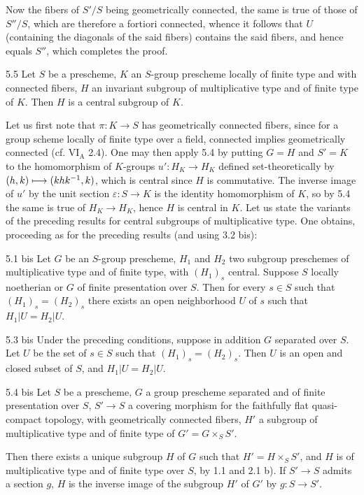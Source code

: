 Now the fibers of $S'/S$ being geometrically connected, the same is true of those of $S''/S$, which are therefore a fortiori connected, whence it follows that $U$ (containing the diagonals of the said fibers) contains the said fibers, and hence equals $S''$, which completes the proof.
\begin{corollary}{5.5}\label{IX.5.5}
Let $S$ be a prescheme, $K$ an $S$-group prescheme locally of finite type and with connected fibers, $H$ an invariant subgroup of multiplicative type and of finite type of $K$. Then $H$ is a central subgroup of $K$.
\end{corollary}
 Let us first note that $\pi:K\to S$ has geometrically connected fibers, since for a group scheme locally of finite type over a field, connected implies geometrically connected (cf. VI$_{\mathrm A}$ 2.4). One may then apply 5.4 by putting $G=H$ and $S'=K$ to the homomorphism of $K$-groups $u':H_K\to H_K$ defined set-theoretically by $(h,k)\longmapsto(khk^{-1},k)$, which is central since $H$ is commutative. The inverse image of $u'$ by the unit section $\varepsilon:S\to K$ is the identity homomorphism of $K$, so by 5.4 the same is true of $H_K\to H_K$, hence $H$ is central in $K$.
Let us state the variants of the preceding results for central subgroups of multiplicative type. One obtains, proceeding as for the preceding results (and using 3.2 bis):
\begin{theorem}{5.1 bis}\label{IX.5.1bis}
Let $G$ be an $S$-group prescheme, $H_1$ and $H_2$ two subgroup preschemes of multiplicative type and of finite type, with $(H_1)_s$ central. Suppose $S$ locally noetherian or $G$ of finite presentation over $S$. Then for every $s\in S$ such that $(H_1)_s=(H_2)_s$ there exists an open neighborhood $U$ of $s$ such that $H_1|U=H_2|U$.
\end{theorem}
\begin{corollary}{5.3 bis}\label{IX.5.3bis}
Under the preceding conditions, suppose in addition $G$ separated over $S$. Let $U$ be the set of $s\in S$ such that $(H_1)_s=(H_2)_s$. Then $U$ is an open and closed subset of $S$, and $H_1|U=H_2|U$.
\end{corollary}
\begin{corollary}{5.4 bis}\label{IX.5.4bis}
Let $S$ be a prescheme, $G$ a group prescheme separated and of finite presentation over $S$, $S'\to S$ a covering morphism for the faithfully flat quasi-compact topology, with geometrically connected fibers, $H'$ a subgroup of multiplicative type and of finite type of $G'=G\times_S S'$.

Then there exists a unique subgroup $H$ of $G$ such that $H'=H\times_S S'$, and $H$ is of multiplicative type and of finite type over $S$, by 1.1 and 2.1 b). If $S'\to S$ admits a section $g$, $H$ is the inverse image of the subgroup $H'$ of $G'$ by $g:S\to S'$.
\end{corollary}

